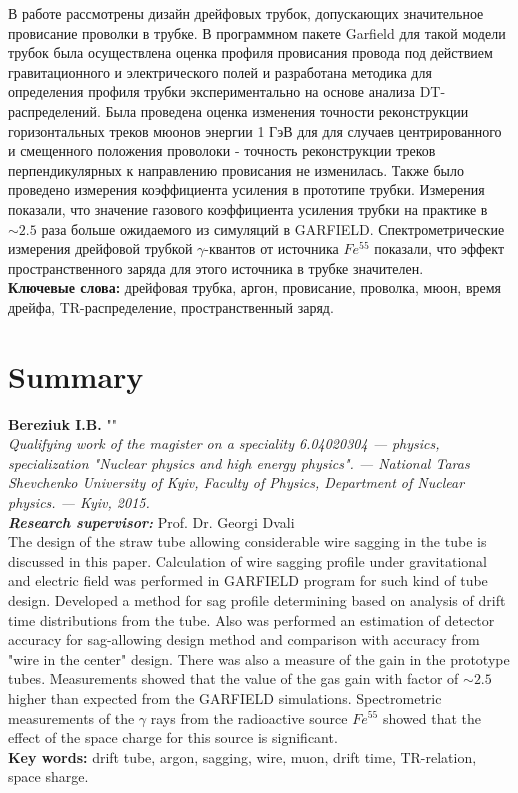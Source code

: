 	В работе рассмотрены дизайн дрейфовых трубок, допускающих значительное провисание проволки в трубке. В программном пакете Garfield для такой модели трубок была осуществлена ​​оценка профиля провисания провода под действием гравитационного и электрического полей и разработана методика для определения профиля трубки экспериментально на основе анализа DT-распределений. Была проведена оценка изменения точности реконструкции горизонтальных треков мюонов энергии 1 ГэВ для для случаев центрированного и смещенного положения проволоки - точность реконструкции треков  перпендикулярных к направлению провисания не изменилась. Также было проведено измерения коэффициента усиления в прототипе трубки. Измерения показали, что значение газового коэффициента усиления трубки на практике в $ \sim 2.5$ раза больше ожидаемого из симуляций в GARFIELD. Спектрометрические измерения дрейфовой трубкой $\gamma$-квантов от источника $Fe^{55}$ показали, что эффект пространственного заряда для этого источника в трубке значителен.
   \\[0.5cm]
  {\bf Ключевые слова:} дрейфовая трубка, аргон, провисание, проволка, мюон, время дрейфа, TR-распределение, пространственный заряд.\\[0.5cm]

\section*{Summary}

  {\bf Bereziuk I.B.} "\thesistopicEN"\\
  {\itshape Qualifying work of the magister on a speciality 6.04020304 --- physics, specialization "Nuclear physics and high energy physics". --- National Taras Shevchenko University of Kyiv, Faculty of Physics, Department of Nuclear physics. --- Kyiv, 2015.\\}
  {\itshape \bfseries Research supervisor:}  Prof. Dr. Georgi Dvali \\%
 The design of the straw tube allowing considerable wire sagging in the tube is discussed in this paper. Calculation of wire sagging profile under gravitational and electric field was performed in GARFIELD program for such kind of tube design.
Developed a method for sag profile determining based on analysis of drift time distributions from the tube. Also was performed an estimation of detector accuracy  for sag-allowing design method and comparison with accuracy from "wire in the center" design. 
	There was also a measure of the gain in the prototype tubes. Measurements showed that the value of the gas gain with factor of $\sim 2.5$ higher than expected from the GARFIELD simulations. Spectrometric measurements of the $\gamma$ rays from the radioactive source $Fe^{55}$ showed that the effect of the space charge for this source is significant.\\[0.5cm]
 {\bf Key words:} drift tube, argon, sagging, wire, muon, drift time, TR-relation, space sharge.\\

